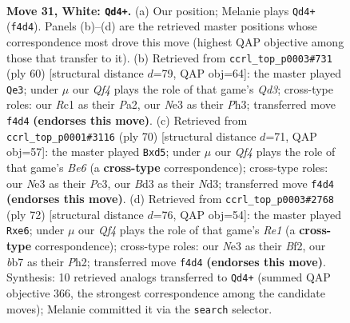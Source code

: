 \documentclass[11pt]{article}
\begin{document}
\clearpage

\begin{figure}[p]\centering
\begin{subfigure}{0.46\textwidth}\centering
\resizebox{\linewidth}{!}{%
\newchessgame
\chessboard[
  setfen={3k2nr/1b2q3/8/r3Pp2/5Q1p/1p1BN2P/6P1/2R3KR w - - 2 31},
  showmover=false,
  pgfstyle=straightmove, color=movearrow, markmove={f4-d4}
]}
\caption{}
\end{subfigure}\hfill
\begin{subfigure}{0.46\textwidth}\centering
\resizebox{\linewidth}{!}{%
\newchessgame
\chessboard[
  setfen={2r3k1/5p2/p1qnpP2/7p/6P1/2PQ3P/P7/2B2RK1 w - - 0 31},
  showmover=false,
  pgfstyle=straightmove, color=movearrow, markmove={d3-e3}
]}
\caption{}
\end{subfigure}
\\[4pt]
\begin{subfigure}{0.46\textwidth}\centering
\resizebox{\linewidth}{!}{%
\newchessgame
\chessboard[
  setfen={3q1r1k/3n2pb/4B2p/2pp1P2/P7/2PN3Q/7P/5R1K w - - 1 36},
  showmover=false,
  pgfstyle=straightmove, color=movearrow, markmove={e6-d5}
]}
\caption{}
\end{subfigure}\hfill
\begin{subfigure}{0.46\textwidth}\centering
\resizebox{\linewidth}{!}{%
\newchessgame
\chessboard[
  setfen={5r1k/4q2p/4r3/3p3Q/1npP1P2/2N5/1PP2B1P/1K2R3 w - - 4 37},
  showmover=false,
  pgfstyle=straightmove, color=movearrow, markmove={e1-e6}
]}
\caption{}
\end{subfigure}
\caption{\textbf{Move 31, White: \texttt{Qd4+}.} (a) Our position; Melanie plays \texttt{Qd4+} (\texttt{f4d4}). Panels (b)--(d) are the retrieved master positions whose correspondence most drove this move (highest QAP objective among those that transfer to it). (b) Retrieved from \texttt{ccrl\_top\_p0003\#731} (ply 60) [structural distance $d$=79, QAP obj=64]: the master played \texttt{Qe3}; under $\mu$ our \emph{Qf4} plays the role of that game's \emph{Qd3}; cross-type roles: our \emph{R}c1 as their \emph{P}a2, our \emph{N}e3 as their \emph{P}h3; transferred move \texttt{f4d4} \textbf{(endorses this move)}. (c) Retrieved from \texttt{ccrl\_top\_p0001\#3116} (ply 70) [structural distance $d$=71, QAP obj=57]: the master played \texttt{Bxd5}; under $\mu$ our \emph{Qf4} plays the role of that game's \emph{Be6} (a \textbf{cross-type} correspondence); cross-type roles: our \emph{N}e3 as their \emph{P}c3, our \emph{B}d3 as their \emph{N}d3; transferred move \texttt{f4d4} \textbf{(endorses this move)}. (d) Retrieved from \texttt{ccrl\_top\_p0003\#2768} (ply 72) [structural distance $d$=76, QAP obj=54]: the master played \texttt{Rxe6}; under $\mu$ our \emph{Qf4} plays the role of that game's \emph{Re1} (a \textbf{cross-type} correspondence); cross-type roles: our \emph{N}e3 as their \emph{B}f2, our \emph{b}b7 as their \emph{P}h2; transferred move \texttt{f4d4} \textbf{(endorses this move)}. Synthesis: 10 retrieved analogs transferred to \texttt{Qd4+} (summed QAP objective 366, the strongest correspondence among the candidate moves); Melanie committed it via the \texttt{search} selector.}
\label{fig:thought-m60}
\end{figure}
\end{document}
